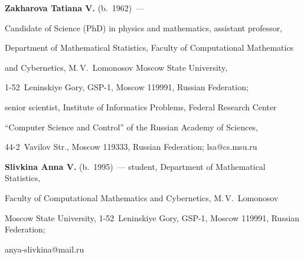 \noindent

\textbf{Zakharova Tatiana V.} (b.\ 1962)~---

 Candidate of Science (PhD) in physics and mathematics, assistant professor, 

 Department of Mathematical Statistics, Faculty of Computational Mathematics 

 and Cybernetics, M.\,V.~Lomonosov Moscow State University, 

 1-52~Leninskiye Gory, GSP-1, Moscow 119991, Russian Federation; 

 senior scientist, Institute of Informatics Problems, Federal Research Center 

 ``Computer Science and Control'' of the Russian Academy of Sciences, 

 44-2~Vavilov Str., Moscow 119333, Russian Federation; \mbox{lsa@cs.msu.ru}

 

 \vspace*{2pt}



\noindent

\textbf{Slivkina Anna V.} (b.\ 1995)~--- student, Department of Mathematical Statistics, 

Faculty of Computational Mathematics and Cybernetics, M.\,V.~Lomonosov 

Moscow State University, 1-52~Leninskiye Gory, GSP-1, Moscow 119991, Russian Federation; 

\mbox{anya-slivkina@mail.ru} 



\label{end\stat}





\renewcommand{\bibname}{\protect\rm Литература}

